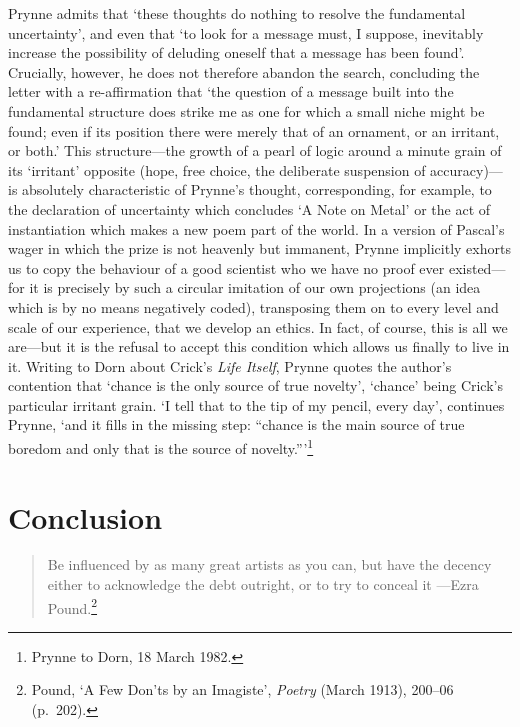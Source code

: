\documentclass[]{article}
\begin{document}
Prynne admits that ‘these thoughts do nothing to resolve the fundamental
uncertainty’, and even that ‘to look for a message must, I suppose,
inevitably increase the possibility of deluding oneself that a message
has been found’. Crucially, however, he does not therefore abandon the
search, concluding the letter with a re-affirmation that ‘the question
of a message built into the fundamental structure does strike me as one
for which a small niche might be found; even if its position there were
merely that of an ornament, or an irritant, or both.’ This structure—the
growth of a pearl of logic around a minute grain of its ‘irritant’
opposite (hope, free choice, the deliberate suspension of accuracy)—is
absolutely characteristic of Prynne’s thought, corresponding, for
example, to the declaration of uncertainty which concludes ‘A Note on
Metal’ or the act of instantiation which makes a new poem part of the
world. In a version of Pascal’s wager in which the prize is not heavenly
but immanent, Prynne implicitly exhorts us to copy the behaviour of a
good scientist who we have no proof ever existed—for it is precisely by
such a circular imitation of our own projections (an idea which is by no
means negatively coded), transposing them on to every level and scale of
our experience, that we develop an ethics. In fact, of course, this is
all we are—but it is the refusal to accept this condition which allows
us finally to live in it. Writing to Dorn about Crick’s \emph{Life
Itself}, Prynne quotes the author’s contention that ‘chance is the only
source of true novelty’, ‘chance’ being Crick’s particular irritant
grain. ‘I tell that to the tip of my pencil, every day’, continues
Prynne, ‘and it fills in the missing step: “chance is the main source of
true boredom and only that is the source of novelty.”’\footnote{Prynne
  to Dorn, 18 March 1982.} \newpage

\section{Conclusion}\label{conclusion}

\begin{quote}
\singlespacing Be influenced by as many great artists as you can, but
have the decency either to acknowledge the debt outright, or to try to
conceal it —Ezra Pound.\footnote{Pound, ‘A Few Don’ts by an Imagiste’,
  \emph{Poetry} (March 1913), 200–06 (p.~202).}
\end{quote}
\end{document}
